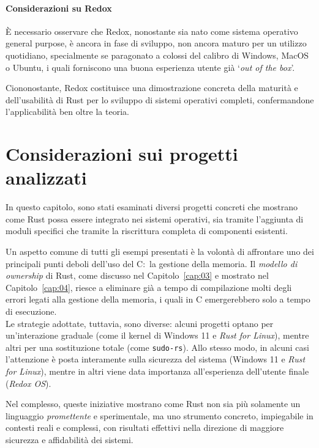 \paragraph{Considerazioni su Redox}
È necessario osservare che Redox, nonostante sia nato come sistema operativo general purpose, è ancora in fase di sviluppo, non ancora 
maturo per un utilizzo quotidiano, specialmente se paragonato a colossi del calibro di Windows, MacOS o Ubuntu, i quali forniscono una buona esperienza utente già `\textit{out of the box}'.

Ciononostante, Redox costituisce una dimostrazione concreta della maturità e dell'usabilità di Rust per lo sviluppo di sistemi operativi completi, confermandone
l'applicabilità ben oltre la teoria.

\section{Considerazioni sui progetti analizzati}
In questo capitolo, sono stati esaminati diversi progetti concreti 
che mostrano come Rust possa essere integrato nei sistemi operativi, sia 
tramite l'aggiunta di moduli specifici che tramite la riscrittura completa di 
componenti esistenti.

Un aspetto comune di tutti gli esempi presentati è la volontà di affrontare uno dei 
principali punti deboli dell'uso del C:\ la gestione della memoria.
Il \textit{modello di ownership} di Rust, come discusso nel Capitolo~\ref{cap:03} 
e mostrato nel Capitolo~\ref{cap:04}, riesce a 
eliminare già a tempo di compilazione molti degli errori legati alla gestione 
della memoria, i quali in C emergerebbero solo a tempo di esecuzione. \hfill
\vspace{10pt}\\
\noindent Le strategie adottate, tuttavia, sono diverse: alcuni progetti optano 
per un'interazione graduale (come il kernel di Windows 11 e \textit{Rust for Linux}), 
mentre altri per una sostituzione totale (come \texttt{sudo-rs}). 
Allo stesso modo, in alcuni casi l'attenzione è posta interamente sulla 
sicurezza del sistema (Windows 11 e \textit{Rust for Linux}), mentre in altri viene 
data importanza all'esperienza dell'utente finale (\textit{Redox OS}).

Nel complesso, queste iniziative mostrano come Rust non sia più solamente un 
linguaggio \textit{promettente} e sperimentale, ma uno strumento concreto, impiegabile
in contesti reali e complessi, con risultati effettivi nella direzione 
di maggiore sicurezza e affidabilità dei sistemi.